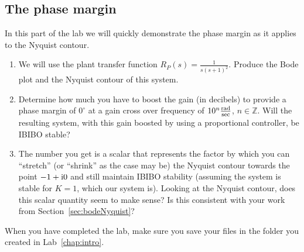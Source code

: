 \subsection{The phase margin}

In this part of the lab we will quickly demonstrate the phase margin as it
applies to the Nyquist contour.
\begin{enumerate}
\item We will use the plant transfer function
$R_{P}(s)=\frac{1}{s(s+1)^{2}}$.  Produce the Bode plot and the Nyquist
contour of this system.

\item Determine how much you have to boost the gain (in decibels) to provide
a phase margin of $0^{\circ}$ at a gain cross over frequency of
$10^{n}\frac{\textup{rad}}{\textup{sec}}$\@, $n\in\mathbb{Z}$\@.  Will the
resulting system, with this gain boosted by using a proportional controller,
be IBIBO stable?

\item The number you get is a scalar that represents the factor by which you
can ``stretch'' (or ``shrink'' as the case may be) the Nyquist contour
towards the point $-1+\textup{i}0$ and still maintain IBIBO stability (assuming
the system is stable for $K=1$, which our system is).  Looking at the Nyquist
contour, does this scalar quantity seem to make sense?  Is this consistent
with your work from Section~\ref{sec:bodeNyquist}?
\end{enumerate}

When you have completed the lab, make sure you save your files in the folder
you created in Lab~\ref{chap:intro}\@.

